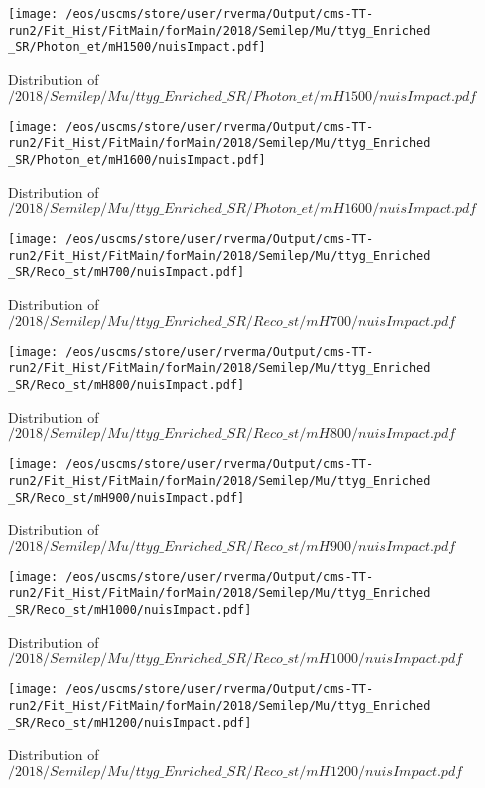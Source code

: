 \begin{figure}
\centering
\texttt{[image: /eos/uscms/store/user/rverma/Output/cms-TT-run2/Fit\_Hist/FitMain/forMain/2018/Semilep/Mu/ttyg\_Enriched\_SR/Photon\_et/mH1500/nuisImpact.pdf]}
\caption{Distribution of $/2018/Semilep/Mu/ttyg\_Enriched\_SR/Photon\_et/mH1500/nuisImpact.pdf$}
\end{figure}

\begin{figure}
\centering
\texttt{[image: /eos/uscms/store/user/rverma/Output/cms-TT-run2/Fit\_Hist/FitMain/forMain/2018/Semilep/Mu/ttyg\_Enriched\_SR/Photon\_et/mH1600/nuisImpact.pdf]}
\caption{Distribution of $/2018/Semilep/Mu/ttyg\_Enriched\_SR/Photon\_et/mH1600/nuisImpact.pdf$}
\end{figure}

\begin{figure}
\centering
\texttt{[image: /eos/uscms/store/user/rverma/Output/cms-TT-run2/Fit\_Hist/FitMain/forMain/2018/Semilep/Mu/ttyg\_Enriched\_SR/Reco\_st/mH700/nuisImpact.pdf]}
\caption{Distribution of $/2018/Semilep/Mu/ttyg\_Enriched\_SR/Reco\_st/mH700/nuisImpact.pdf$}
\end{figure}

\begin{figure}
\centering
\texttt{[image: /eos/uscms/store/user/rverma/Output/cms-TT-run2/Fit\_Hist/FitMain/forMain/2018/Semilep/Mu/ttyg\_Enriched\_SR/Reco\_st/mH800/nuisImpact.pdf]}
\caption{Distribution of $/2018/Semilep/Mu/ttyg\_Enriched\_SR/Reco\_st/mH800/nuisImpact.pdf$}
\end{figure}

\begin{figure}
\centering
\texttt{[image: /eos/uscms/store/user/rverma/Output/cms-TT-run2/Fit\_Hist/FitMain/forMain/2018/Semilep/Mu/ttyg\_Enriched\_SR/Reco\_st/mH900/nuisImpact.pdf]}
\caption{Distribution of $/2018/Semilep/Mu/ttyg\_Enriched\_SR/Reco\_st/mH900/nuisImpact.pdf$}
\end{figure}

\begin{figure}
\centering
\texttt{[image: /eos/uscms/store/user/rverma/Output/cms-TT-run2/Fit\_Hist/FitMain/forMain/2018/Semilep/Mu/ttyg\_Enriched\_SR/Reco\_st/mH1000/nuisImpact.pdf]}
\caption{Distribution of $/2018/Semilep/Mu/ttyg\_Enriched\_SR/Reco\_st/mH1000/nuisImpact.pdf$}
\end{figure}

\begin{figure}
\centering
\texttt{[image: /eos/uscms/store/user/rverma/Output/cms-TT-run2/Fit\_Hist/FitMain/forMain/2018/Semilep/Mu/ttyg\_Enriched\_SR/Reco\_st/mH1200/nuisImpact.pdf]}
\caption{Distribution of $/2018/Semilep/Mu/ttyg\_Enriched\_SR/Reco\_st/mH1200/nuisImpact.pdf$}
\end{figure}

